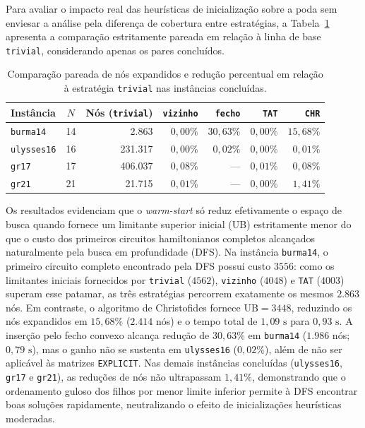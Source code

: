 \documentclass[12pt]{article}
\begin{document}
Para avaliar o impacto real das heurísticas de inicialização sobre a poda sem enviesar a análise pela diferença de cobertura entre estratégias, a Tabela~\ref{tab:warmstart_pareado} apresenta a comparação estritamente pareada em relação à linha de base \texttt{trivial}, considerando apenas os pares concluídos.

\begin{table}[ht]
\centering
\caption{Comparação pareada de nós expandidos e redução percentual em relação à estratégia \texttt{trivial} nas instâncias concluídas.}
\label{tab:warmstart_pareado}
\small
\begin{tabular}{lcrrrrr}
\toprule
\textbf{Instância} & \textbf{$N$} & \textbf{Nós (\texttt{trivial})} & \textbf{\texttt{vizinho}} & \textbf{\texttt{fecho}} & \textbf{\texttt{TAT}} & \textbf{\texttt{CHR}} \\
\midrule
\texttt{burma14}   & 14 & 2.863   & $0{,}00\%$ & $30{,}63\%$ & $0{,}00\%$ & $15{,}68\%$ \\
\texttt{ulysses16} & 16 & 231.317 & $0{,}00\%$ & $0{,}02\%$  & $0{,}00\%$ & $0{,}01\%$  \\
\texttt{gr17}      & 17 & 406.037 & $0{,}08\%$ & ---         & $0{,}01\%$ & $0{,}08\%$  \\
\texttt{gr21}      & 21 & 21.715  & $0{,}01\%$ & ---         & $0{,}00\%$ & $1{,}41\%$  \\
\bottomrule
\end{tabular}
\end{table}

Os resultados evidenciam que o \textit{warm-start} só reduz efetivamente o espaço de busca quando fornece um limitante superior inicial (UB) estritamente menor do que o custo dos primeiros circuitos hamiltonianos completos alcançados naturalmente pela busca em profundidade (DFS). Na instância \texttt{burma14}, o primeiro circuito completo encontrado pela DFS possui custo $3556$: como os limitantes iniciais fornecidos por \texttt{trivial} ($4562$), \texttt{vizinho} ($4048$) e \texttt{TAT} ($4003$) superam esse patamar, as três estratégias percorrem exatamente os mesmos $2.863$ nós. Em contraste, o algoritmo de Christofides fornece $\text{UB} = 3448$, reduzindo os nós expandidos em $15{,}68\%$ ($2.414$ nós) e o tempo total de $1{,}09\text{ s}$ para $0{,}93\text{ s}$. A inserção pelo fecho convexo alcança redução de $30{,}63\%$ em \texttt{burma14} ($1.986$ nós; $0{,}79\text{ s}$), mas o ganho não se sustenta em \texttt{ulysses16} ($0{,}02\%$), além de não ser aplicável às matrizes \texttt{EXPLICIT}. Nas demais instâncias concluídas (\texttt{ulysses16}, \texttt{gr17} e \texttt{gr21}), as reduções de nós não ultrapassam $1{,}41\%$, demonstrando que o ordenamento guloso dos filhos por menor limite inferior permite à DFS encontrar boas soluções rapidamente, neutralizando o efeito de inicializações heurísticas moderadas.
\end{document}
